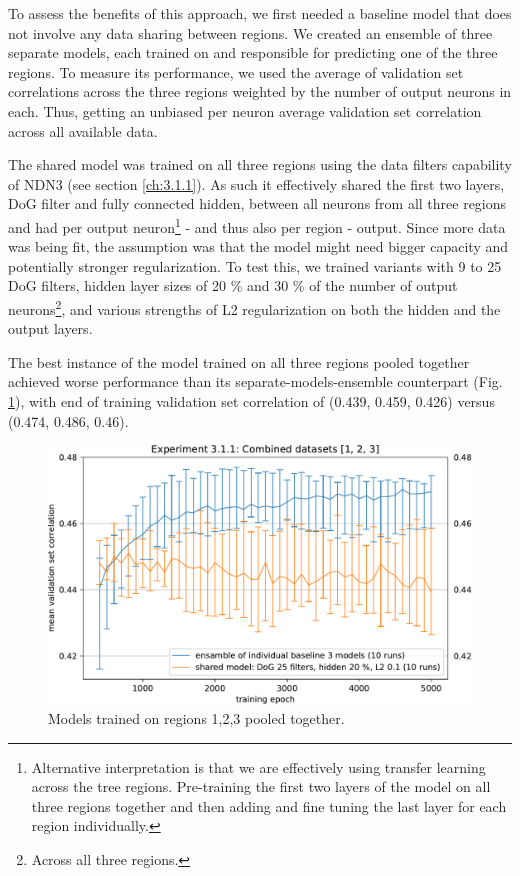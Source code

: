 To assess the benefits of this approach, we first needed a baseline model that does not involve any data sharing between regions. We created an ensemble of three separate models, each trained on and responsible for predicting one of the three regions. To measure its performance, we used the average of validation set correlations across the three regions weighted by the number of output neurons in each. Thus, getting an unbiased per neuron average validation set correlation across all available data.

The shared model was trained on all three regions using the data filters capability of NDN3 (see section \ref{ch:3.1.1}). As such it effectively shared the first two layers, DoG filter and fully connected hidden, between all neurons from all three regions and had per output neuron\footnote{Alternative interpretation is that we are effectively using transfer learning across the tree regions. Pre-training the first two layers of the model on all three regions together and then adding and fine tuning the last layer for each region individually.} - and thus also per region - output. Since more data was being fit, the assumption was that the model might need bigger capacity and potentially stronger regularization. To test this, we trained variants with 9 to 25 DoG filters, hidden layer sizes of 20 \% and 30 \% of the number of output neurons\footnote{Across all three regions.}, and various strengths of L2 regularization on both the hidden and the output layers. 

The best instance of the model trained on all three regions pooled together achieved worse performance than its separate-models-ensemble counterpart (Fig. \ref{fig:5.3.1.1_1}), with end of training validation set correlation of (0.439, 0.459, 0.426) versus (0.474, 0.486, 0.46). 

\begin{figure}[H]
    \centering
    \includegraphics[width=1\textwidth]{../figures/05_3_1_1_1}
    \caption[Experiment 3.1.1]{Models trained on regions 1,2,3 pooled together\protect\footnotemark.}
    \label{fig:5.3.1.1_1}
\end{figure}


